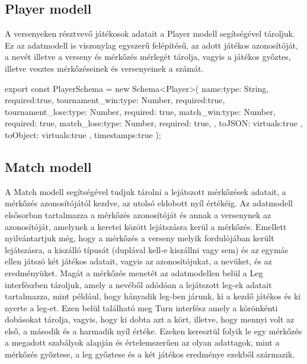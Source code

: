 \subsection{Player modell}
A versenyeken résztvevő játékosok adatait a Player modell segítségével tároljuk. Ez az adatmodell is viszonylag egyszerű felépítésű, az adott játékos azonosítóját, a nevét illetve a verseny és mérkőzés mérlegét tárolja, vagyis a játékos győztes, illetve vesztes mérkőzéseinek és versenyeinek a számát.

\begin{cpp}
export const PlayerSchema = new Schema<Player>(
    {
        name:{type: String, required:true},
        tournament_win:{type: Number, required:true},
        tournament_lose:{type: Number, required: true},
        match_win:{type: Number, required: true},
        match_lose:{type: Number, required: true},
    },{
        toJSON:{
            virtuals:true
        },
        toObject:{
            virtuals:true
        },
        timestamps:true
    }
);
\end{cpp}

\subsection{Match modell}
A Match modell segítségével tudjuk tárolni a lejátszott mérkőzések adatait, a mérkőzés azonosítójától kezdve, az utolsó eldobott nyíl értékéig. Az adatmodell elsősorban tartalmazza a mérkőzés azonosítóját és annak a versenynek az azonosítóját, amelynek a keretei között lejátszásra kerül a mérkőzés. Emellett nyilvántartjuk még, hogy a mérkőzés a verseny melyik fordulójában került lejátszásra, a kiszálló típusát (duplával kell-e kiszállni vagy sem) és az egymás ellen játszó két játékos adatait, vagyis az azonosítójukat, a nevüket, és az eredményüket. Magát a mérkőzés menetét az adatmodellen belül a Leg interfészben tároljuk, amely a nevéből adódóan a lejátszott leg-ek adatait tartalmazza, mint például, hogy hányadik leg-ben járunk, ki a kezdő játékos és ki nyerte a leg-et. Ezen belül található meg Turn interfész amely a körönkénti dobásokat tárolja, vagyis, hogy ki dobta azt a kört, illetve, hogy mennyi volt az első, a második és a harmadik nyíl értéke. Ezeken keresztül folyik le egy mérkőzés a megadott szabályok alapján és értelemszerűen az olyan adattagok, mint a mérkőzés győztese, a leg győztese és a két játékos eredménye ezekből származik.

